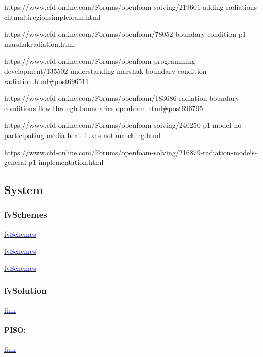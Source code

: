 \documentclass[a4paper, 12pt]{article}
\numberwithin{equation}{section}
\newcommand{\blue}[1]{\textcolor{blue}{#1}}
\begin{document}
	        https://www.cfd-online.com/Forums/openfoam-solving/219601-adding-radiations-chtmultiregionsimplefoam.html

	        https://www.cfd-online.com/Forums/openfoam/78052-boundary-condition-p1-marshakradiation.html

	        https://www.cfd-online.com/Forums/openfoam-programming-development/135502-understanding-marshak-boundary-condition-radiation.html\#post696511

	        https://www.cfd-online.com/Forums/openfoam/183686-radiation-boundary-conditions-flow-through-boundaries-openfoam.html\#post696795

	        https://www.cfd-online.com/Forums/openfoam-solving/240250-p1-model-no-participating-media-heat-fluxes-not-matching.html

	        https://www.cfd-online.com/Forums/openfoam-solving/216879-radiation-models-general-p1-implementation.html

    \subsection{System}

    \subsubsection{fvSchemes}

        \href{https://www.openfoam.com/documentation/user-guide/6-solving/6.2-numerical-schemes}{\blue{fvSchemes}}

        \href{https://doc.cfd.direct/openfoam/user-guide-v7/fvschemes}{\blue{fvSchemes}}

        \href{https://www.wolfdynamics.com/training/introOF8/supplement_tipsandtricks.pdf}{\blue{fvSchemes}}

    \subsubsection{fvSolution}

        \href{https://doc.cfd.direct/openfoam/user-guide-v11/fvsolution}{\blue{link}}

        \paragraph{PISO:\\}

            \href{https://openfoamwiki.net/index.php/PISO}{\blue{link}}
\end{document}
